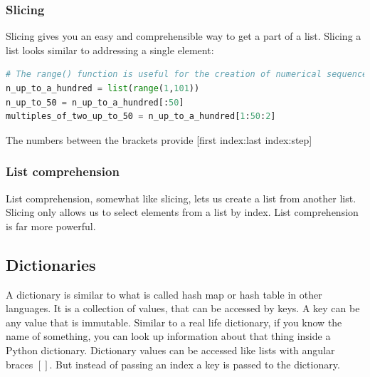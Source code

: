 \documentclass{article}
\begin{document}


\subsubsection{Slicing}

Slicing gives you an easy and comprehensible way to get a part of a list.
Slicing a list looks similar to addressing a single element:

\begin{lstlisting}[language=Python]
# The range() function is useful for the creation of numerical sequences.
n_up_to_a_hundred = list(range(1,101))
n_up_to_50 = n_up_to_a_hundred[:50]
multiples_of_two_up_to_50 = n_up_to_a_hundred[1:50:2]
\end{lstlisting}
The numbers between the brackets provide [first index:last index:step]


\subsubsection{List comprehension}

List comprehension, somewhat like slicing, lets us create a list from another list.
Slicing only allows us to select elements from a list by index.
List comprehension is far more powerful.

\subsection{Dictionaries}\label{dictionary}

A dictionary is similar to what is called hash map or hash table in other languages.
It is a collection of values, that can be accessed by keys.
A key can be any value that is immutable.
Similar to a real life dictionary, if you know the name of something, you can look up
information about that thing inside a Python dictionary.
Dictionary values can be accessed like lists with angular braces $[]$.
But instead of passing an index a key is passed to the dictionary.
\end{document}
